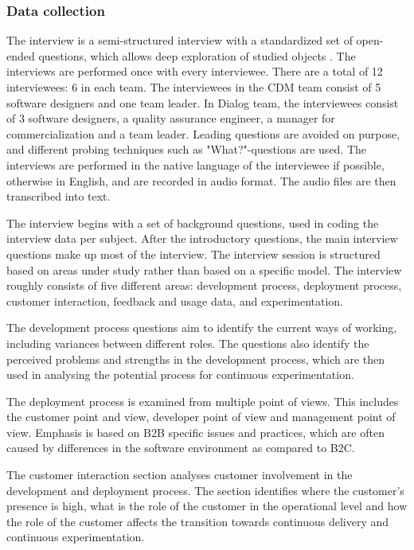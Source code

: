 \documentclass[english, grading]{tktltiki2}
\theoremstyle{definition}
\theoremstyle{remark}
\begin{document}
\subsubsection{Data collection} %
The interview is a semi-structured interview with a standardized set of open-ended questions, which allows deep exploration of studied objects \cite{runeson2009guidelines}. The interviews are performed once with every interviewee. There are a total of 12 interviewees: 6 in each team. The interviewees in the CDM team consist of 5 software designers and one team leader. In Dialog team, the interviewees consist of 3 software designers, a quality assurance engineer, a manager for commercialization and a team leader. Leading questions are avoided on purpose, and different probing techniques such as "What?"-questions are used. The interviews are performed in the native language of the interviewee if possible, otherwise in English, and are recorded in audio format. The audio files are then transcribed into text.

The interview begins with a set of background questions, used in coding the interview data per subject. After the introductory questions, the main interview questions make up most of the interview. The interview session is structured based on areas under study rather than based on a specific model. The interview roughly consists of five different areas: development process, deployment process, customer interaction, feedback and usage data, and experimentation.

The development process questions aim to identify the current ways of working, including variances between different roles. The questions also identify the perceived problems and strengths in the development process, which are then used in analysing the potential process for continuous experimentation. 

The deployment process is examined from multiple point of views. This includes the customer point and view, developer point of view and management point of view. Emphasis is based on B2B specific issues and practices, which are often caused by differences in the software environment as compared to B2C.  

The customer interaction section analyses customer involvement in the development and deployment process. The section identifies where the customer's presence is high, what is the role of the customer in the operational level and how the role of the customer affects the transition towards continuous delivery and continuous experimentation. 
\end{document}
